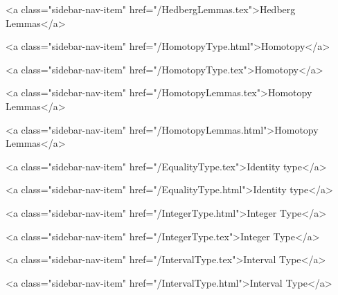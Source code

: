       
    
      
        
          <a class="sidebar-nav-item" href="/HedbergLemmas.tex">Hedberg Lemmas</a>
        
      
    
      
        
          <a class="sidebar-nav-item" href="/HomotopyType.html">Homotopy</a>
        
      
    
      
        
          <a class="sidebar-nav-item" href="/HomotopyType.tex">Homotopy</a>
        
      
    
      
        
          <a class="sidebar-nav-item" href="/HomotopyLemmas.tex">Homotopy Lemmas</a>
        
      
    
      
        
          <a class="sidebar-nav-item" href="/HomotopyLemmas.html">Homotopy Lemmas</a>
        
      
    
      
        
          <a class="sidebar-nav-item" href="/EqualityType.tex">Identity type</a>
        
      
    
      
        
          <a class="sidebar-nav-item" href="/EqualityType.html">Identity type</a>
        
      
    
      
        
          <a class="sidebar-nav-item" href="/IntegerType.html">Integer Type</a>
        
      
    
      
        
          <a class="sidebar-nav-item" href="/IntegerType.tex">Integer Type</a>
        
      
    
      
        
          <a class="sidebar-nav-item" href="/IntervalType.tex">Interval Type</a>
        
      
    
      
        
          <a class="sidebar-nav-item" href="/IntervalType.html">Interval Type</a>
        
